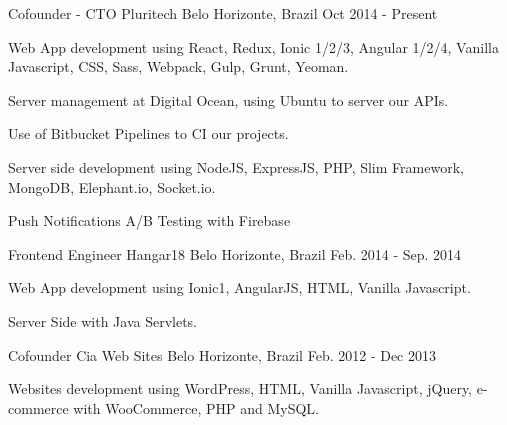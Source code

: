 

\begin{cventries}

  \cventry
    {Cofounder - CTO} %
    {Pluritech} %
    {Belo Horizonte, Brazil} %
    {Oct 2014 - Present} %
    {
      \begin{cvitems} %
        \item {Web App development using React, Redux, Ionic 1/2/3, Angular 1/2/4, Vanilla Javascript, CSS, Sass, Webpack, Gulp, Grunt, Yeoman.}
        \item {Server management at Digital Ocean, using Ubuntu to server our APIs.}
        \item {Use of Bitbucket Pipelines to CI our projects.}
        \item {Server side development using NodeJS, ExpressJS, PHP, Slim Framework, MongoDB, Elephant.io, Socket.io.}
        \item {Push Notifications A/B Testing with Firebase}
      \end{cvitems}
    }

  \cventry
    {Frontend Engineer} %
    {Hangar18} %
    {Belo Horizonte, Brazil} %
    {Feb. 2014  - Sep. 2014} %
    {
      \begin{cvitems} %
        \item {Web App development using Ionic1, AngularJS, HTML, Vanilla Javascript.}
        \item {Server Side with Java Servlets.}
      \end{cvitems}
    }

  \cventry
    {Cofounder} %
    {Cia Web Sites} %
    {Belo Horizonte, Brazil} %
    {Feb. 2012 - Dec 2013} %
    {
      \begin{cvitems} %
        \item {Websites development using WordPress, HTML, Vanilla Javascript, jQuery, e-commerce with WooCommerce, PHP and MySQL.}
      \end{cvitems}
    }


\end{cventries}
